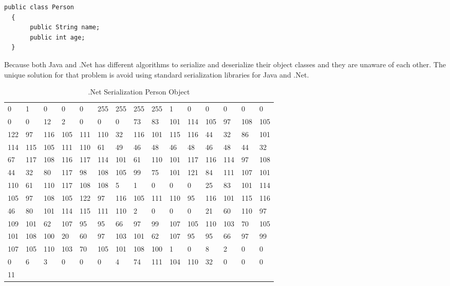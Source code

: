\begin{lstlisting}[caption=Person Object, label=lst:javaperson]
  public class Person
  {
       public String name;
       public int age;
  }
\end{lstlisting}
Because both Java and .Net has different algorithms to serialize and deserialize their object classes and they are unaware of each other. The unique solution for that problem is avoid using standard serialization libraries for Java and .Net.
\begin{table}[]
\centering
\begin{tabular}{lllllllllllllll}
0   & 1   & 0   & 0   & 0   & 255 & 255 & 255 & 255 & 1   & 0   & 0   & 0   & 0   & 0  \\
0   & 0   & 12  & 2   & 0   & 0   & 0   & 73  & 83  & 101 & 114 & 105 & 97  & 108 & 105\\
122 & 97  & 116 & 105 & 111 & 110 & 32  & 116 & 101 & 115 & 116 & 44  & 32  & 86  & 101\\
114 & 115 & 105 & 111 & 110 & 61  & 49  & 46  & 48  & 46  & 48  & 46  & 48  & 44  & 32 \\
67  & 117 & 108 & 116 & 117 & 114 & 101 & 61  & 110 & 101 & 117 & 116 & 114 & 97  & 108\\
44  & 32  & 80  & 117 & 98  & 108 & 105 & 99  & 75  & 101 & 121 & 84  & 111 & 107 & 101\\
110 & 61  & 110 & 117 & 108 & 108 & 5   & 1   & 0   & 0   & 0   & 25  & 83  & 101 & 114\\
105 & 97  & 108 & 105 & 122 & 97  & 116 & 105 & 111 & 110 & 95  & 116 & 101 & 115 & 116\\
46  & 80  & 101 & 114 & 115 & 111 & 110 & 2   & 0   & 0   & 0   & 21  & 60  & 110 & 97 \\
109 & 101 & 62  & 107 & 95  & 95  & 66  & 97  & 99  & 107 & 105 & 110 & 103 & 70  & 105\\
101 & 108 & 100 & 20  & 60  & 97  & 103 & 101 & 62  & 107 & 95  & 95  & 66  & 97  & 99 \\
107 & 105 & 110 & 103 & 70  & 105 & 101 & 108 & 100 & 1   & 0   & 8   & 2   & 0   & 0  \\
0   & 6   & 3   & 0   & 0   & 0   & 4   & 74  & 111 & 104 & 110 & 32  & 0   & 0   & 0  \\
11  &     &     &     &     &     &     &     &     &     &     &     &     &     &    \\
\end{tabular}
\caption[.Net Serialization Person Object]{.Net Serialization Person Object}
\label{tab:netserilazitaon}
\end{table}


